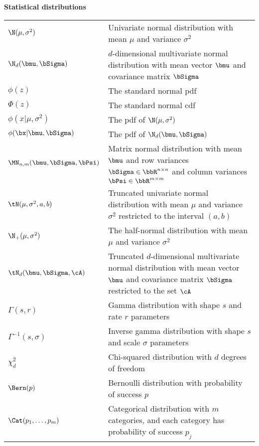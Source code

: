 \noindent\textbf{Statistical distributions}

\begin{longtable}{p{}p{}}
  $\N(\mu,\sigma^2)$ & Univariate normal distribution with mean $\mu$ and variance $\sigma^2$ \\
  $\N_d(\bmu,\bSigma)$  & $d$-dimensional multivariate normal distribution with mean vector $\bmu$ and covariance matrix $\bSigma$ \\
  $\phi(z)$  & The standard normal pdf \\  
  $\Phi(z)$  & The standard normal cdf \\  
  $\phi(x|\mu,\sigma^2)$  & The pdf of $\N(\mu,\sigma^2)$ \\  
  $\phi(\bx|\bmu,\bSigma)$  & The  pdf of $\N_d(\bmu,\bSigma)$\\  
  $\MN_{n,m}(\bmu,\bSigma,\bPsi)$  & Matrix normal distribution with mean $\bmu$ and row variances $\bSigma\in\bbR^{n\times n}$ and column variances $\bPsi\in\bbR^{m\times m}$ \\  
  $\tN(\mu,\sigma^2,a,b)$ & Truncated univariate normal distribution with mean $\mu$ and variance $\sigma^2$ restricted to the interval $(a,b)$ \\
  $\N_+(\mu,\sigma^2)$ & The half-normal distribution with mean $\mu$ and variance $\sigma^2$   \\  
  $\tN_d(\bmu,\bSigma,\cA)$  & Truncated $d$-dimensional multivariate normal distribution with mean vector $\bmu$ and covariance matrix $\bSigma$ restricted to the set $\cA$ \\  
  $\Gamma(s,r)$ & Gamma distribution with shape $s$ and rate $r$ parameters  \\  
  $\Gamma^{-1}(s,\sigma)$ & Inverse gamma distribution with shape $s$ and scale $\sigma$ parameters  \\    
  $\chi_d^2$  & Chi-squared distribution with $d$ degrees of freedom \\    
  $\Bern(p)$ & Bernoulli distribution with probability of success $p$ \\
  $\Cat(p_1,\dots,p_m)$ & Categorical distribution with $m$ categories, and each category has probability of success $p_j$ \\  
\end{longtable}
